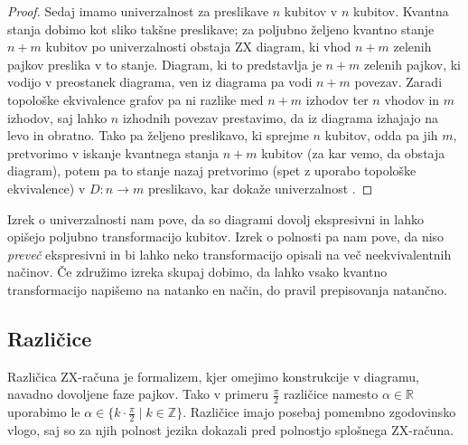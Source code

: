 \documentclass[mat1]{fmfdelo}
\newcommand{\R}{\mathbb R}
\newcommand{\Z}{\mathbb Z}
\begin{document}
\begin{proof}
Sedaj imamo univerzalnost za preslikave \(n\) kubitov v \(n\) kubitov. Kvantna stanja dobimo kot sliko takšne preslikave; za poljubno željeno kvantno stanje \(n+m\) kubitov po univerzalnosti obstaja ZX diagram, ki vhod \(n+m\) zelenih pajkov preslika v to stanje. Diagram, ki to predstavlja je \(n+m\) zelenih pajkov, ki vodijo v preostanek diagrama, ven iz diagrama pa vodi \(n+m\) povezav. Zaradi topološke ekvivalence grafov pa ni razlike med \(n+m\) izhodov ter \(n\) vhodov in \(m\) izhodov, saj lahko \(n\) izhodnih povezav prestavimo, da iz diagrama izhajajo na levo in obratno. Tako pa željeno preslikavo, ki sprejme \(n\) kubitov, odda pa jih \(m\), pretvorimo v iskanje kvantnega stanja \(n+m\) kubitov (za kar vemo, da obstaja diagram), potem pa to stanje nazaj pretvorimo (spet z uporabo topološke ekvivalence) v \(D:n\to m\) preslikavo, kar dokaže univerzalnost \cite[Izrek 2.18]{Coecke_2011}. \end{proof}

Izrek o univerzalnosti nam pove, da so diagrami dovolj ekspresivni in lahko opišejo poljubno transformacijo kubitov. Izrek o polnosti pa nam pove, da niso \emph{preveč} ekspresivni in bi lahko neko transformacijo opisali na več neekvivalentnih načinov. Če združimo izreka skupaj dobimo, da lahko vsako kvantno transformacijo napišemo na natanko en način, do pravil prepisovanja natančno.

\subsection{Različice}
Različica ZX-računa je formalizem, kjer omejimo konstrukcije v diagramu, navadno dovoljene faze pajkov. Tako v primeru \(\frac\pi2\) različice namesto \(\alpha\in \R\) uporabimo le \(\alpha\in\{k\cdot \frac\pi2\mid k\in\Z\}\). Različice imajo posebaj pomembno zgodovinsko vlogo, saj so za njih polnost jezika dokazali pred polnostjo splošnega ZX-računa.
\end{document}
